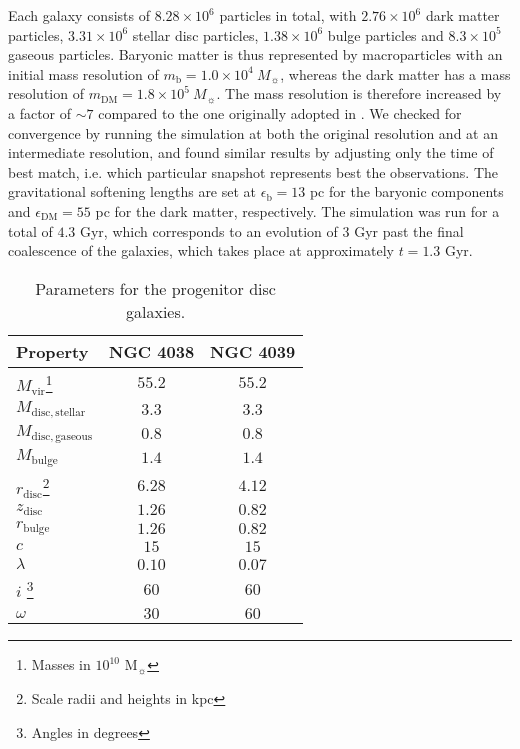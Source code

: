 \documentclass[a4paper,fleqn,usenatbib]{mnras}
\begin{document}
Each galaxy consists of $8.28\times10^{6}$ particles in total, with 
$2.76\times10^{6}$ dark matter particles, $3.31\times10^{6}$ stellar disc 
particles, $1.38\times10^{6}$ bulge particles and $8.3\times10^{5}$ gaseous 
particles. Baryonic matter is thus represented by macroparticles with an initial 
mass resolution of $m_\mathrm{b}= 1.0 \times 10^4 \ M_{\sun}$, whereas the dark matter 
has a mass resolution of $m_\mathrm{DM}=1.8\times10^5 \ M_{\sun}$. 
The mass resolution is therefore increased by a factor of $\sim 7$ compared to the one originally
adopted in \citet{2010ApJ...715L..88K}. We checked for convergence by running the simulation at 
both the original \citet{2010ApJ...715L..88K} resolution and at an intermediate resolution, and found 
similar results by adjusting only the time of best match,
i.e. which particular snapshot represents best the observations.
The gravitational softening lengths are set at $\epsilon_\mathrm{b}=13$ pc for the baryonic components
and $\epsilon_\mathrm{DM}=55$ pc for the dark matter, respectively. 
The simulation was run for a total of
$4.3$ Gyr, which corresponds to an evolution of $3$ Gyr past the final coalescence of the galaxies, which takes place 
at approximately $t=1.3$ Gyr.



\begin{table}
 \caption{Parameters for the progenitor disc galaxies.}
 \label{tab:ic_parameters}
 \begin{minipage}{6cm}
 \begin{tabular}{lcc}
  \hline
  Property & NGC 4038 & NGC 4039\\
  \hline
  $M_\mathrm{vir}$\footnote{Masses in $10^{10}$ M$_{\sun}$}& $55.2$ & 
$55.2$  \\[2pt]
  $M_\mathrm{disc, stellar}$ & $3.3$ & $3.3$ \\[2pt]
  $M_\mathrm{disc, gaseous}$ & $0.8$ & $0.8$ \\[2pt]
  $M_\mathrm{bulge}$ & $1.4$ & $1.4$ \\[2pt]
  \hline
  $r_\mathrm{disc}$\footnote{Scale radii and heights in kpc} & $6.28$ & $4.12$ 
\\[2pt]
  $z_\mathrm{disc}$ & $1.26$ & $0.82$ \\[2pt]
  $r_\mathrm{bulge}$ & $1.26$ & $0.82$ \\[2pt]
  $c$ 	& $15$ & $15$ \\[2pt]
  $\lambda$ & $0.10$ & $0.07$ \\[2pt]
  \hline
  $i$ \footnote{Angles in degrees} & $60$ & $60$ \\[2pt]
  $\omega$ & $30$ & $60$ \\[2pt]
  \hline
 \end{tabular}
 \end{minipage}
\end{table}
\end{document}
